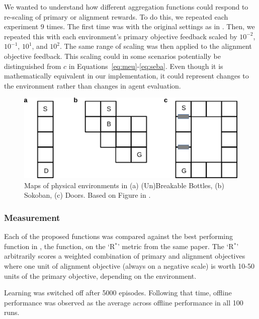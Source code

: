 We wanted to understand how different aggregation functions could respond to re-scaling of primary or alignment rewards. To do this, we repeated each experiment 9 times. The first time was with the original settings as in \cite{vamplew_potential-based_2021}. Then, we repeated this with each environment's primary objective feedback scaled by $10^{-2}$, $10^{-1}$, $10^1$, and $10^2$. The same range of scaling was then applied to the alignment objective feedback. This scaling could in some scenarios potentially be distinguished from $c$ in Equations~\ref{eq:meu}-\ref{eq:seba}. Even though it is mathematically equivalent in our implementation, it could represent changes to the environment rather than changes in agent evaluation.


\begin{figure}
    \centering
    \includegraphics[width=1\columnwidth]{output/env_figure.pdf}
    \caption{Maps of physical environments in (a) (Un)Breakable Bottles, (b) Sokoban, (c) Doors. Based on Figure in \cite{vamplew_potential-based_2021}.}
    \label{fig:envs}
\end{figure}

\subsubsection{Measurement}

Each of the proposed functions was compared against the best performing function in \cite{vamplew_potential-based_2021}, the \tloA{} function, on the `R$^*$' metric from the same paper. The `R$^*$' arbitrarily scores a weighted combination of primary and alignment objectives where one unit of alignment objective (always on a negative scale) is worth 10-50 units of the primary objective, depending on the environment.%

Learning was switched off after 5000 episodes. Following that time, offline performance was observed as the average across offline performance in all 100 runs.

